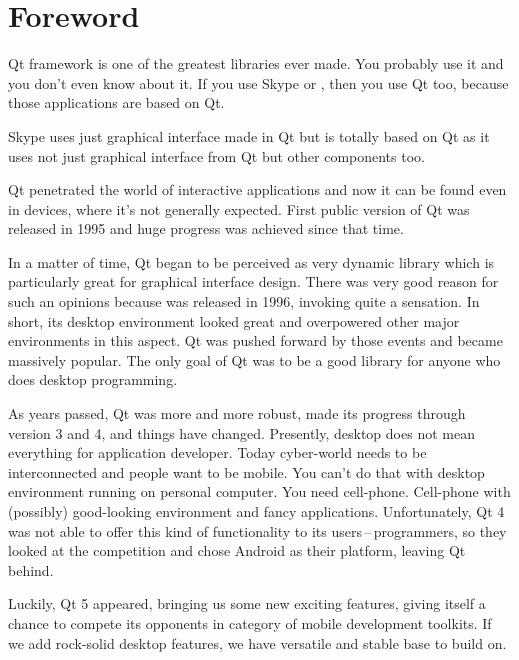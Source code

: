 \chapter{Foreword}
Qt framework \citep{various:qthome} is one of the greatest libraries ever made. You probably use it and you don't even know about it. If you use Skype \citep{various:skype} or  \citep{various:kde}, then you use Qt too, because those applications are based on Qt.

Skype uses just graphical interface made in Qt but  is totally based on Qt as it uses not just graphical interface from Qt but other components too.

Qt penetrated the world of interactive applications and now it can be found even in devices, where it's not generally expected. First public version of Qt was released in 1995 and huge progress was achieved since that time.

In a matter of time, Qt began to be perceived as very dynamic library which is particularly great for graphical interface design. There was very good reason for such an opinions because  was released in 1996, invoking quite a sensation. In short, its desktop environment looked great and overpowered other major environments in this aspect. Qt was pushed forward by those events and became massively popular. The only goal of Qt was to be a good library for anyone who does desktop programming.

As years passed, Qt was more and more robust,  made its progress through version 3 and 4, and things have changed. Presently, desktop does not mean everything for application developer. Today cyber-world needs to be interconnected and people want to be mobile. You can't do that with desktop environment running on personal computer. You need cell-phone. Cell-phone with (possibly) good-looking environment and fancy applications. Unfortunately, Qt 4 was not able to offer this kind of functionality to its users\,--\,programmers, so they looked at the competition and chose Android as their platform, leaving Qt behind.

Luckily, Qt 5 appeared, bringing us some new exciting features, giving itself a chance to compete its opponents in category of mobile development toolkits. If we add rock-solid desktop features, we have versatile and stable base to build on.


